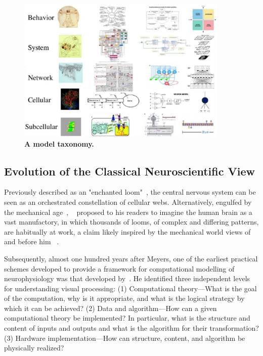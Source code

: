 \documentclass[11pt,3p,twocolumn]{JMN}
\begin{document}
\begin{figure}[h!t]
  \begin{center}
    \includegraphics[width=0.9\textwidth]{figures/multi-scale-taxonomy-no-arrows-no-texts.pdf}
    \caption{ \small{\bf A model taxonomy.} }
  \end{center}
  \label{fig:multi-scale-taxonomy}
\end{figure}

\subsection{Evolution of the Classical Neuroscientific View}

Previously described as an "enchanted loom"~\citep{sherrington53}, the central nervous system can be seen as an orchestrated constellation of cellular webs. Alternatively, engulfed by the mechanical age~\citep{carlyle52}, ~\citet{meyers87} proposed to his readers to imagine the human brain as a vast manufactory, in which thousands of looms, of complex and differing patterns, are habitually at work, a claim likely inspired by the mechanical world views of ~\citet{descartes62} and before him ~\citet[][republished 2003]{fernel67}. 

Subsequently, almost one hundred years after Meyers, one of the earliest practical schemes developed to provide a framework for computational modelling of neurophysiology was that developed by~\citet{Marr:1982fk}. He identified three independent levels for understanding visual processing: (1) Computational theory---What is the goal of the computation, why is it appropriate, and what is the logical strategy by which it can be achieved? (2) Data and algorithm---How can a given computational theory be implemented? In particular, what is the structure and content of inputs and outputs and what is the algorithm for their transformation? (3) Hardware implementation---How can structure, content, and algorithm be physically realized?
\end{document}
